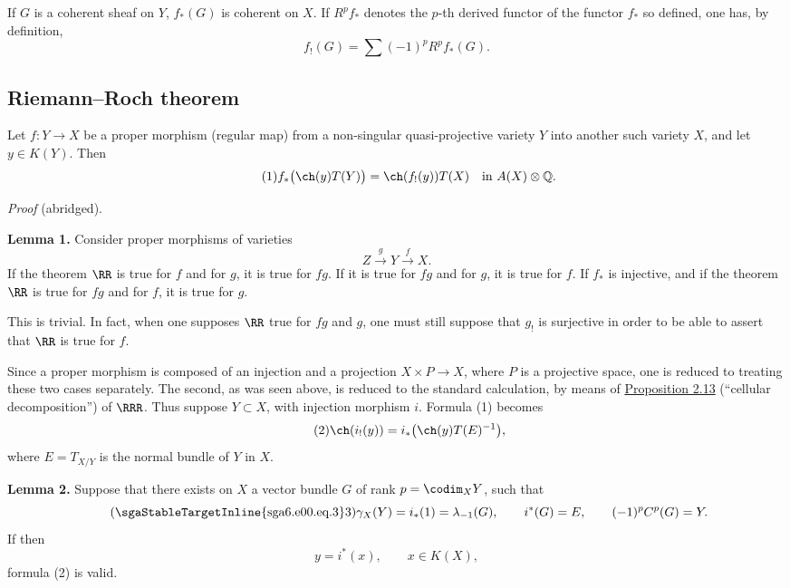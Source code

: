 If \(G\) is a coherent sheaf on \(Y\), \(f_*(G)\) is coherent on \(X\). If \(R^pf_*\) denotes the \(p\)-th derived functor of the functor \(f_*\) so defined, one has, by definition,
\[
  f_!(G)=\sum(-1)^p R^pf_*(G).
\]

\subsection*{Riemann--Roch theorem}
Let \(f:Y\to X\) be a proper morphism (regular map) from a non-singular quasi-projective variety \(Y\) into another such variety \(X\), and let \(y\in K(Y)\). Then
\begin{equation}\tag{1}
  f_*\bigl(\ch(y)T(Y)\bigr)=\ch(f_!(y))T(X)
  \quad\text{in } A(X)\otimes\mathbb Q.
\end{equation}

\emph{Proof} (abridged).

\textbf{Lemma 1.} Consider proper morphisms of varieties
\[
  Z \xrightarrow{g} Y \xrightarrow{f} X.
\]
If the theorem \(\RR\) is true for \(f\) and for \(g\), it is true for \(fg\). If it is true for \(fg\) and for \(g\), it is true for \(f\). If \(f_*\) is injective, and if the theorem \(\RR\) is true for \(fg\) and for \(f\), it is true for \(g\).

This is trivial. In fact, when one supposes \(\RR\) true for \(fg\) and \(g\), one must still suppose that \(g_!\) is surjective in order to be able to assert that \(\RR\) is true for \(f\).

Since a proper morphism is composed of an injection and a projection \(X\times P\to X\), where \(P\) is a projective space, one is reduced to treating these two cases separately. The second, as was seen above, is reduced to the standard calculation, by means of \hyperlink{sga6.e00.prop.2-13}{Proposition 2.13} (``cellular decomposition'') of \(\RRR\). Thus suppose \(Y\subset X\), with injection morphism \(i\). Formula (1) becomes
\begin{equation}\tag{2}
  \ch(i_!(y))=i_*\bigl(\ch(y)T(E)^{-1}\bigr),
\end{equation}
where \(E=T_{X/Y}\) is the normal bundle of \(Y\) in \(X\).

\textbf{Lemma 2.} Suppose that there exists on \(X\) a vector bundle \(G\) of rank \(p=\codim_XY\), such that
\begin{equation}\tag{\sgaStableTargetInline{sga6.e00.eq.3}3}
  \gamma_X(Y)=i_*(1)=\lambda_{-1}(G),\qquad
  i^*(G)=E,\qquad
  (-1)^pC^p(G)=Y.
\end{equation}
If then
\begin{equation}\tag{4}
  y=i^*(x),\qquad x\in K(X),
\end{equation}
formula (2) is valid.

